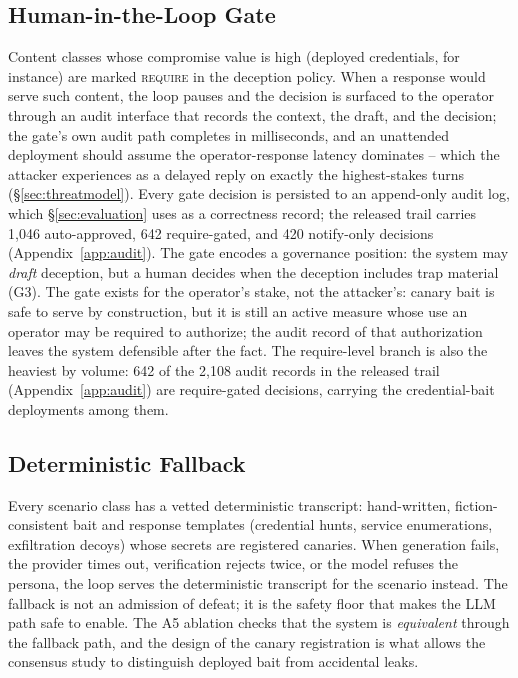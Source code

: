 \subsection{Human-in-the-Loop Gate}
\label{sec:hitl}
Content classes whose compromise value is high (deployed credentials,
for instance) are marked \textsc{require} in the deception policy. When a
response would serve such content, the loop pauses and the decision is
surfaced to the operator through an audit interface that records the
context, the draft, and the decision; the gate's own audit path
completes in milliseconds, and an unattended deployment should assume
the operator-response latency dominates -- which the attacker
experiences as a delayed reply on exactly the highest-stakes turns
(\S\ref{sec:threatmodel}). Every gate decision is persisted to
an append-only audit log, which \S\ref{sec:evaluation} uses as a
correctness record; the released trail carries 1{,}046 auto-approved,
642 require-gated, and 420 notify-only decisions
(Appendix~\ref{app:audit}).
The gate encodes a governance position: the system may \emph{draft}
deception, but a human decides when the deception includes trap
material (G3). The gate exists for the operator's stake, not the
attacker's: canary bait is safe to serve by construction, but it is
still an active measure whose use an operator may be required to
authorize; the audit record of that authorization leaves the system
defensible after the fact. The require-level branch is also
the heaviest by volume: 642 of the 2{,}108 audit records in the
released trail (Appendix~\ref{app:audit}) are require-gated decisions,
carrying the credential-bait deployments among them.

\subsection{Deterministic Fallback}
\label{sec:fallback}
Every scenario class has a vetted deterministic transcript: hand-written,
fiction-consistent bait and response templates (credential hunts, service
enumerations, exfiltration decoys) whose secrets are registered canaries.
When generation fails, the provider times out, verification rejects twice,
or the model refuses the persona, the loop serves the deterministic
transcript for the scenario instead. The fallback is not an admission of
defeat; it is the safety floor that makes the LLM path safe to enable.
The A5 ablation checks that the system is \emph{equivalent} through the
fallback path, and the design of the canary registration is what allows
the consensus study to distinguish deployed bait from accidental leaks.

